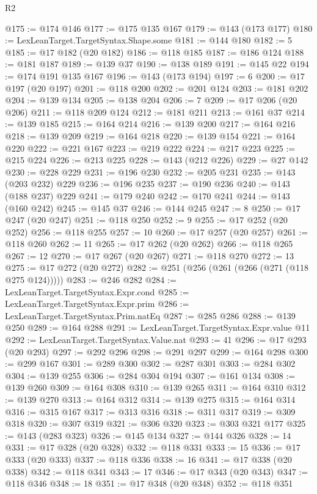 \begin{lexlean}{R2}
\begin{coremodule}
@175 := @174 @146
@177 := @175 @135 @167
@179 := @143 (@173 @177)
@180 := LexLeanTarget.TargetSyntax.Shape.some
@181 := @144 @180
@182 := 5
@185 := @17 @182 (@20 @182)
@186 := @118 @185
@187 := @186 @124
@188 := @181 @187
@189 := @139 @37
@190 := @138 @189
@191 := @145 @22
@194 := @174 @191 @135 @167
@196 := @143 (@173 @194)
@197 := 6
@200 := @17 @197 (@20 @197)
@201 := @118 @200
@202 := @201 @124
@203 := @181 @202
@204 := @139 @134
@205 := @138 @204
@206 := 7
@209 := @17 @206 (@20 @206)
@211 := @118 @209 @124
@212 := @181 @211
@213 := @161 @37
@214 := @139 @185
@215 := @164 @214
@216 := @139 @200
@217 := @164 @216
@218 := @139 @209
@219 := @164 @218
@220 := @139 @154
@221 := @164 @220
@222 := @221 @167
@223 := @219 @222
@224 := @217 @223
@225 := @215 @224
@226 := @213 @225
@228 := @143 (@212 @226)
@229 := @27 @142
@230 := @228 @229
@231 := @196 @230
@232 := @205 @231
@235 := @143 (@203 @232) @229
@236 := @196 @235
@237 := @190 @236
@240 := @143 (@188 @237) @229
@241 := @179 @240
@242 := @170 @241
@244 := @143 (@160 @242)
@245 := @145 @37
@246 := @144 @245
@247 := 8
@250 := @17 @247 (@20 @247)
@251 := @118 @250
@252 := 9
@255 := @17 @252 (@20 @252)
@256 := @118 @255
@257 := 10
@260 := @17 @257 (@20 @257)
@261 := @118 @260
@262 := 11
@265 := @17 @262 (@20 @262)
@266 := @118 @265
@267 := 12
@270 := @17 @267 (@20 @267)
@271 := @118 @270
@272 := 13
@275 := @17 @272 (@20 @272)
@282 := @251 (@256 (@261 (@266 (@271 (@118 @275 @124)))))
@283 := @246 @282
@284 := LexLeanTarget.TargetSyntax.Expr.cond
@285 := LexLeanTarget.TargetSyntax.Expr.prim
@286 := LexLeanTarget.TargetSyntax.Prim.natEq
@287 := @285 @286
@288 := @139 @250
@289 := @164 @288
@291 := LexLeanTarget.TargetSyntax.Expr.value @11
@292 := LexLeanTarget.TargetSyntax.Value.nat
@293 := 41
@296 := @17 @293 (@20 @293)
@297 := @292 @296
@298 := @291 @297
@299 := @164 @298
@300 := @299 @167
@301 := @289 @300
@302 := @287 @301
@303 := @284 @302
@304 := @139 @255
@306 := @284 @304 @194
@307 := @161 @134
@308 := @139 @260
@309 := @164 @308
@310 := @139 @265
@311 := @164 @310
@312 := @139 @270
@313 := @164 @312
@314 := @139 @275
@315 := @164 @314
@316 := @315 @167
@317 := @313 @316
@318 := @311 @317
@319 := @309 @318
@320 := @307 @319
@321 := @306 @320
@323 := @303 @321 @177
@325 := @143 (@283 @323)
@326 := @145 @134
@327 := @144 @326
@328 := 14
@331 := @17 @328 (@20 @328)
@332 := @118 @331
@333 := 15
@336 := @17 @333 (@20 @333)
@337 := @118 @336
@338 := 16
@341 := @17 @338 (@20 @338)
@342 := @118 @341
@343 := 17
@346 := @17 @343 (@20 @343)
@347 := @118 @346
@348 := 18
@351 := @17 @348 (@20 @348)
@352 := @118 @351

\end{coremodule}
\end{lexlean}
